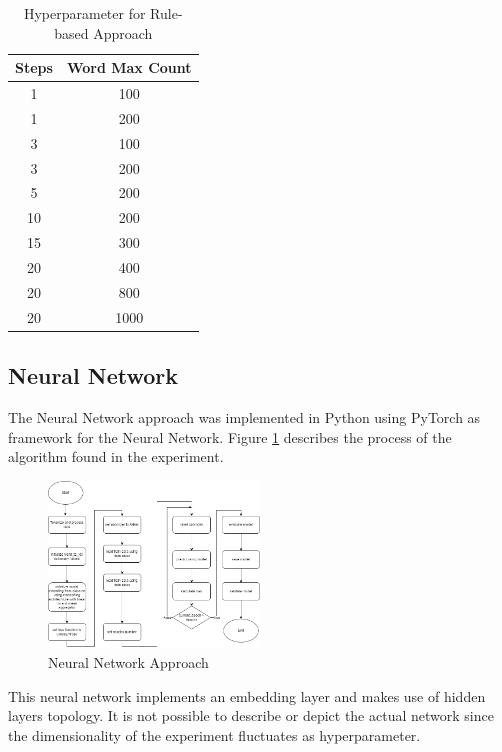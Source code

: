 \begin{table}[H]
\begin{center}
\begin{tabular}{||c|c||}
    \hline
    Steps & Word Max Count \\
    \hline
    1 & 100 \\
    1 & 200 \\
    3 & 100 \\
    3 & 200 \\
    5 & 200 \\
    10 & 200 \\
    15 & 300 \\
    20 & 400 \\
    20 & 800 \\
    20 & 1000 \\
    \hline
\end{tabular}
\caption[Rule-based Hyperparameters]{Hyperparameter for Rule-based Approach}
\label{tab:rule-hyperparameters}
\end{center}
\end{table}

\subsection{Neural Network}

The Neural Network approach was implemented in Python using PyTorch as framework for the Neural Network. Figure \ref{fig:neural-network} describes the process of the algorithm found in the experiment.

\begin{figure}[H]
    \centering
    \includegraphics*[width=0.5\textwidth]{images/neural-network.png}
    \caption{Neural Network Approach}
    \label{fig:neural-network}
\end{figure}

This neural network implements an embedding layer and makes use of hidden layers topology. It is not possible to describe or depict the actual network since the dimensionality of the experiment fluctuates as hyperparameter.

